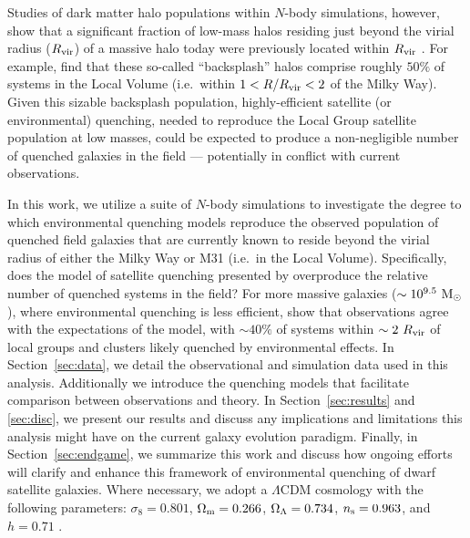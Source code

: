 Studies of dark matter halo populations within $N$-body simulations,
however, show that a significant fraction of low-mass halos residing
just beyond the virial radius ($R_{\rm vir}$) of a massive halo today
were previously located within $R_{\rm vir}$ \citep{balogh00, mamon04,
  gill05, teyssier12, wetzel14}. 
%
For example, \citet{GK14} find that these so-called ``backsplash'' halos
comprise roughly $50\%$ of systems in the Local Volume (i.e.~within
$1 < R/R_{\rm vir} < 2$ of the Milky Way).
%
Given this sizable backsplash population, highly-efficient satellite (or
environmental) quenching, needed to reproduce the Local Group satellite
population at low masses, could be expected to produce a non-negligible
number of quenched galaxies in the field --- potentially in conflict
with current observations. 
%



In this work, we utilize a suite of $N$-body simulations to investigate the
degree to which environmental quenching models reproduce the observed
population of quenched field galaxies that are currently known to
reside beyond the virial radius of either the Milky Way or M31
(i.e.~in the Local Volume). 
%
Specifically, does the model of satellite quenching presented by
\citet{fham15, fham16} overproduce the relative number of quenched
systems in the field? 
%
For more massive galaxies ($\sim10^{9.5}~{\rm M}_{\odot}$), where environmental
quenching is less efficient, \citet{wetzel14} show that observations
agree with the expectations of the model, with $\sim40\%$
of systems within $\sim2~R_{\rm{vir}}$ of local groups and clusters likely
quenched by environmental effects.
%
In Section~\ref{sec:data}, we detail the observational and simulation
data used in this analysis. Additionally we introduce the quenching
models that facilitate comparison between observations and theory.
%
In Section~\ref{sec:results} and \ref{sec:disc}, we present our
results and discuss any implications and limitations this analysis
might have on the current galaxy evolution paradigm.
%
Finally, in Section~\ref{sec:endgame}, we summarize this work and
discuss how ongoing efforts will clarify and enhance this framework of
environmental quenching of dwarf satellite galaxies.
%
Where necessary, we adopt a $\Lambda$CDM cosmology with the following
parameters: $\sigma_{8}=0.801$, $\Omega_{\rm m}=0.266$,
$\Omega_{\rm \Lambda}=0.734$, $n_{\rm s}=0.963$, and
$h=0.71$ \citep[WMAP7,][]{larson11}. 




